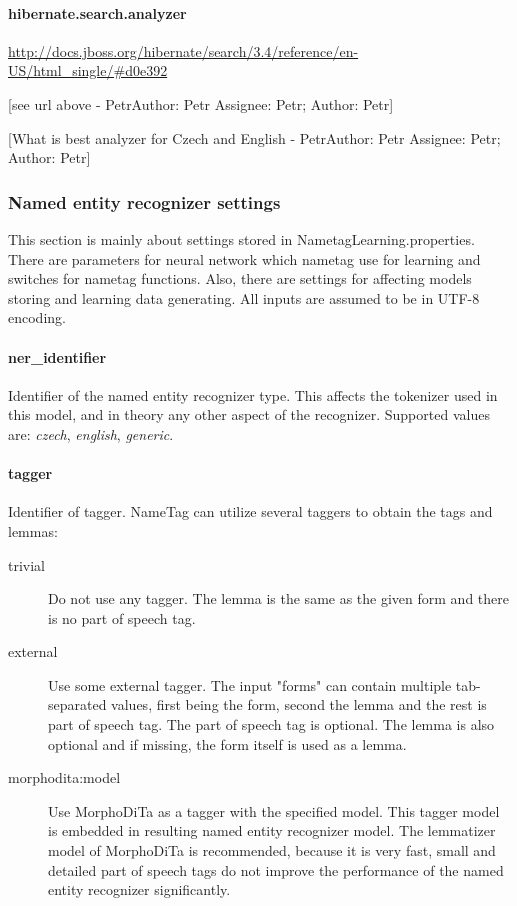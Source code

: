 \documentclass[12pt,a4paper]{report}
\makeatletter
\newcommand{\comment}[3][\@empty]{
  {\color{magenta}[#3 - }
  {\color{green}\ifx\@empty#1\relax Author: #2 \else Assignee: #1; Author: #2\fi}{\color{magenta}]}
}
\makeatother
\begin{document}
\paragraph{hibernate.search.analyzer}
\url{http://docs.jboss.org/hibernate/search/3.4/reference/en-US/html_single/#d0e392}
\comment[Petr]{Petr}{see url above}
\comment[Petr]{Petr}{What is best analyzer for Czech and English}

\subsubsection{Named entity recognizer settings}
This section is mainly about settings stored in NametagLearning.properties. There
are parameters for neural network which nametag use for learning and switches for
nametag functions. Also, there are settings for affecting models storing and
learning data generating. All inputs are assumed to be in UTF-8 encoding.

\paragraph{ner\_identifier}
Identifier of the named entity recognizer type. This affects the tokenizer used
in this model, and in theory any other aspect of the recognizer. Supported values
are: \emph{czech}, \emph{english}, \emph{generic}.

\paragraph{tagger}
Identifier of tagger. NameTag can utilize several taggers to obtain the tags and lemmas:

\begin{description}
\item[trivial]
Do not use any tagger. The lemma is the same as the given form and there is no
part of speech tag.
\item[external]
Use some external tagger. The input "forms" can contain multiple tab-separated
values, first being the form, second the lemma and the rest is part of speech tag.
The part of speech tag is optional. The lemma is also optional and if missing,
the form itself is used as a lemma.
\item[morphodita:model]
Use MorphoDiTa as a tagger with the specified model. This tagger model is embedded
in resulting named entity recognizer model. The lemmatizer model of MorphoDiTa
is recommended, because it is very fast, small and detailed part of speech tags
do not improve the performance of the named entity recognizer significantly.
\end{description}
\end{document}
